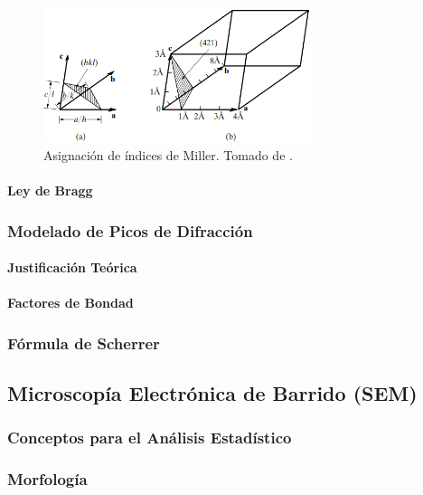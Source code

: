 \documentclass[../main.tex]{subfiles}
\begin{document}
\begin{figure}[H]
    \centering
    \includegraphics[width=0.7\textwidth]{fig/miller.png}
    \caption{Asignación de índices de Miller. Tomado de \cite{Cullity2014}.}
    \label{millerdiag}
\end{figure}
\paragraph{Ley de Bragg}

\subsubsection{Modelado de Picos de Difracción}

\paragraph{Justificación Teórica}

\paragraph{Factores de Bondad}

\subsubsection{Fórmula de Scherrer}

\subsection{Microscopía Electrónica de Barrido (SEM)}

\subsubsection{Conceptos para el Análisis Estadístico}

\subsubsection{Morfología}
\end{document}
